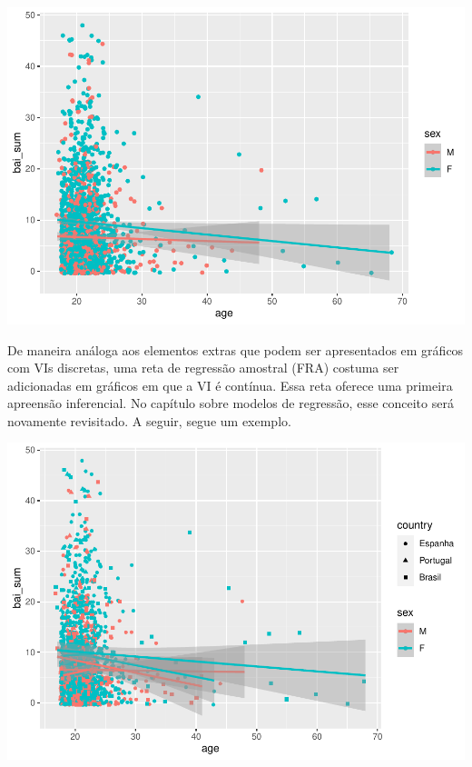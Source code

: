 \documentclass[
]{book}
\newenvironment{Shaded}{\begin{snugshade}}{\end{snugshade}}
\newcommand{\DataTypeTok}[1]{\textcolor[rgb]{0.13,0.29,0.53}{#1}}
\newcommand{\KeywordTok}[1]{\textcolor[rgb]{0.13,0.29,0.53}{\textbf{#1}}}
\newcommand{\NormalTok}[1]{#1}
\newcommand{\OperatorTok}[1]{\textcolor[rgb]{0.81,0.36,0.00}{\textbf{#1}}}
\newcommand{\StringTok}[1]{\textcolor[rgb]{0.31,0.60,0.02}{#1}}
\begin{document}
\begin{center}\includegraphics{gitbook-demo_files/figure-latex/unnamed-chunk-26-1} \end{center}

De maneira análoga aos elementos extras que podem ser apresentados em gráficos com VIs discretas, uma reta de regressão amostral (FRA) costuma ser adicionadas em gráficos em que a VI é contínua. Essa reta oferece uma primeira apreensão inferencial. No capítulo sobre modelos de regressão, esse conceito será novamente revisitado. A seguir, segue um exemplo.

\begin{Shaded}
\end{Shaded}

\begin{center}\includegraphics{gitbook-demo_files/figure-latex/unnamed-chunk-27-1} \end{center}
\end{document}
